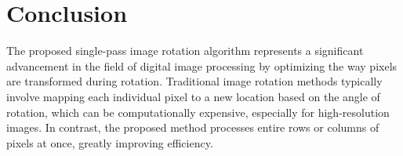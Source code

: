 \documentclass[conference]{IEEEtran}
\begin{document}
\begin{table}[H]
    \caption{Image Specifications}
    \centering
    \renewcommand{\arraystretch}{1.8} %
    \label{tab:image_specifications}
\end{table}



\section{Conclusion}

The proposed single-pass image rotation algorithm represents a significant advancement in the field of digital image processing by optimizing the way pixels are transformed during rotation. Traditional image rotation methods typically involve mapping each individual pixel to a new location based on the angle of rotation, which can be computationally expensive, especially for high-resolution images. In contrast, the proposed method processes entire rows or columns of pixels at once, greatly improving efficiency.
\end{document}
